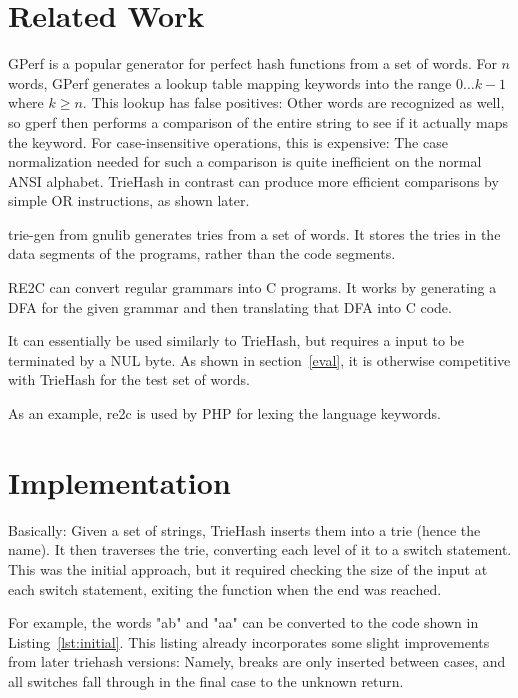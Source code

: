 \documentclass[parskip=half]{scrartcl}
\begin{document}
    \section{Related Work}
    GPerf\cite{schmidt2000gperf} is a popular generator for perfect hash
    functions from a set of words. For $n$ words, GPerf generates a lookup
    table mapping keywords into the range $0\ldots k-1$ where $k \ge n$. This
    lookup has false positives: Other words are recognized as well, so gperf
    then performs a comparison of the entire string to see if it actually maps
    the keyword. For case-insensitive operations, this is expensive: The case
    normalization needed for such a comparison is quite inefficient on the
    normal ANSI alphabet. TrieHash in contrast can produce more efficient
    comparisons by simple OR instructions, as shown later.

    trie-gen from gnulib generates tries from a set of words. It stores
    the tries in the data segments of the programs, rather than the code
    segments.

    RE2C\cite{bumbulis1993re2c} can convert regular grammars into C
    programs. It works by generating a DFA for the given grammar and
    then translating that DFA into C code.

    It can essentially be used similarly to TrieHash, but requires a input
    to be terminated by a NUL byte. As shown in section~\ref{eval}, it is
    otherwise competitive with TrieHash for the test set of words.

    As an example, re2c is used by PHP for lexing the language keywords.
    
    
    \section{Implementation}
    Basically: Given a set of strings, TrieHash inserts them into a trie
    (hence the name). It then traverses the trie, converting each level
    of it to a switch statement. This was the initial approach, but it
    required checking the size of the input at each switch statement,
    exiting the function when the end was reached.

    For example, the words "ab" and "aa" can be converted to the code shown
    in Listing~\ref{lst:initial}. This listing already incorporates some slight
    improvements from later triehash versions: Namely, breaks are only inserted
    between cases, and all switches fall through in the final case to the
    unknown return.
\end{document}
